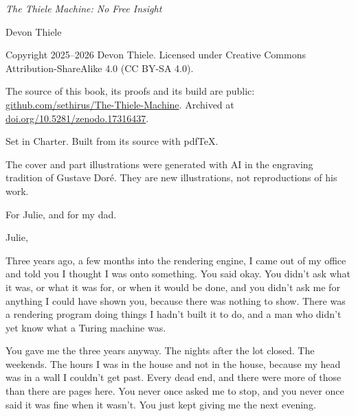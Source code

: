 \documentclass[11pt,twoside]{article}
\theoremstyle{thielethm}
\theoremstyle{thieledef}
\theoremstyle{thieledef}
\theoremstyle{thieledef}
\theoremstyle{thielethm}
\theoremstyle{thieleobs}
\theoremstyle{thielethm}
\begin{document}
\hypersetup{pageanchor=false}
\pagestyle{empty}
\BookCover
\cleardoublepage

\vspace*{112pt}
\noindent{}

\vspace{42pt}

\vspace{7pt}
\clearpage

\vspace*{\fill}
\begingroup\footnotesize\setlength{\parindent}{0pt}\setlength{\parskip}{5pt}
\noindent\textit{The Thiele Machine: No Free Insight}

Devon Thiele

Copyright 2025--2026 Devon Thiele. Licensed under Creative Commons Attribution-ShareAlike 4.0 (CC BY-SA 4.0).

The source of this book, its proofs and its build are public:
\href{https://github.com/sethirus/The-Thiele-Machine}{github.com/sethirus/The-Thiele-Machine}.
Archived at \href{https://doi.org/10.5281/zenodo.17316437}{doi.org/10.5281/zenodo.17316437}.

Set in Charter. Built from its source with pdfTeX.

The cover and part illustrations were generated with AI in the engraving
tradition of Gustave Dor\'e. They are new illustrations, not reproductions
of his work.
\endgroup
\cleardoublepage

\vspace*{154pt}
\begingroup
\noindent For Julie, and for my dad.

\vspace{28pt}
\noindent Julie,

Three years ago, a few months into the rendering engine, I came out of my office and told you I
thought I was onto something. You said okay. You didn't ask what it was, or what it was for, or
when it would be done, and you didn't ask me for anything I could have shown you, because there
was nothing to show. There was a rendering program doing things I hadn't built it to do, and a
man who didn't yet know what a Turing machine was.

You gave me the three years anyway. The nights after the lot closed. The weekends. The hours I
was in the house and not in the house, because my head was in a wall I couldn't get past. Every
dead end, and there were more of those than there are pages here. You never once asked me to
stop, and you never once said it was fine when it wasn't. You just kept giving me the next
evening.
\end{document}
